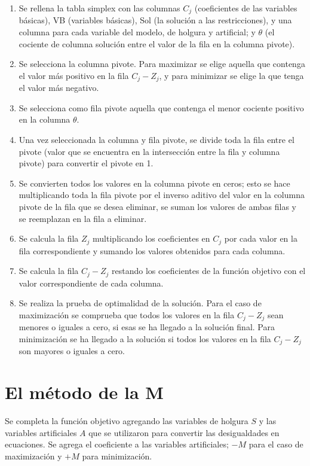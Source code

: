 \begin{enumerate}
	\item Se rellena la tabla simplex con las columnas $C_j$ (coeficientes de las variables básicas), VB (variables básicas), Sol (la solución a las restricciones), y una columna para cada variable del modelo, de holgura y artificial; y $\theta$ (el cociente de columna solución entre el valor de la fila en la columna pivote).
	
	\item Se selecciona la columna pivote. Para maximizar se elige aquella que contenga el valor más positivo en la fila $C_j-Z_j$, y para minimizar se elige la que tenga el valor más negativo.
	
	\item Se selecciona como fila pivote aquella que contenga el menor cociente positivo en la columna $\theta$.
	
	\item Una vez seleccionada la columna y fila pivote, se divide toda la fila entre el pivote (valor que se encuentra en la intersección entre la fila y columna pivote) para convertir el pivote en 1.
	
	\item Se convierten todos los valores en la columna pivote en ceros; esto se hace multiplicando toda la fila pivote por el inverso aditivo del valor en la columna pivote de la fila que se desea eliminar, se suman los valores de ambas filas y se reemplazan en la fila a eliminar.
	
	\item Se calcula la fila $Z_j$ multiplicando los coeficientes en $C_j$ por cada valor en la fila correspondiente y sumando los valores obtenidos para cada columna.
	
	\item Se calcula la fila $C_j-Z_j$ restando los coeficientes de la función objetivo con el valor correspondiente de cada columna.
	
	\item Se realiza la prueba de optimalidad de la solución. Para el caso de maximización se comprueba que todos los valores en la fila $C_j-Z_j$ sean menores o iguales a cero, si esas se ha llegado a la solución final. Para minimización se ha llegado a la solución si todos los valores en la fila $C_j-Z_j$ son mayores o iguales a cero.
\end{enumerate}



\section{El método de la M}
Se completa la función objetivo agregando las variables de holgura $S$ y las variables artificiales $A$ que se utilizaron para convertir las desigualdades en ecuaciones. Se agrega el coeficiente a las variables artificiales; $-M$ para el caso de maximización y $+M$ para minimización.


